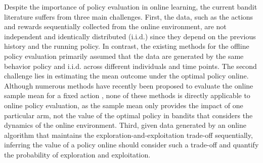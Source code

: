 Despite the importance of policy evaluation in online learning, the current bandit literature suffers from three main challenges. 
First, the data, such as the actions and rewards sequentially collected from the online environment, are not independent and identically distributed (i.i.d.) since they depend on the previous history and the running policy. In contrast, the existing methods for the offline policy evaluation \citep[see e.g., ][]{li2011unbiased,dudik2011doubly} primarily assumed that the data are generated by the same behavior policy and i.i.d. across different individuals and time points. 
The second challenge lies in {estimating the mean outcome under the optimal policy online}. Although numerous methods have recently been proposed to evaluate the online sample mean for a fixed action \citep[see e.g., ][]{nie2018adaptively,neel2018mitigating,deshpande2018accurate,shin2019sample,shin2019bias,waisman2019online,hadad2019confidence,zhang2020inference}, none of these methods is directly applicable to online policy evaluation, as the sample mean only provides the impact of one particular arm, not the value of the optimal policy in bandits that considers the dynamics of the online environment. 
Third, given data generated by an online algorithm that maintains the exploration-and-exploitation trade-off sequentially, inferring the value of a policy online should consider such a trade-off and quantify the probability of exploration and exploitation. 


